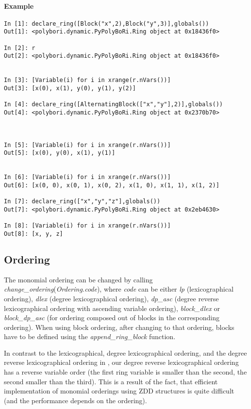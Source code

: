 \documentclass[]{article}
\newcommand{\functionname}[1]{\textit{#1}\xspace}
\begin{document}
\paragraph{Example}
\begin{lstlisting}
In [1]: declare_ring([Block("x",2),Block("y",3)],globals())
Out[1]: <polybori.dynamic.PyPolyBoRi.Ring object at 0x18436f0>

In [2]: r
Out[2]: <polybori.dynamic.PyPolyBoRi.Ring object at 0x18436f0>


In [3]: [Variable(i) for i in xrange(r.nVars())]
Out[3]: [x(0), x(1), y(0), y(1), y(2)]

In [4]: declare_ring([AlternatingBlock(["x","y"],2)],globals())
Out[4]: <polybori.dynamic.PyPolyBoRi.Ring object at 0x2370b70>



In [5]: [Variable(i) for i in xrange(r.nVars())]
Out[5]: [x(0), y(0), x(1), y(1)]


In [6]: [Variable(i) for i in xrange(r.nVars())]
Out[6]: [x(0, 0), x(0, 1), x(0, 2), x(1, 0), x(1, 1), x(1, 2)]

In [7]: declare_ring(["x","y","z"],globals())
Out[7]: <polybori.dynamic.PyPolyBoRi.Ring object at 0x2eb4630>

In [8]: [Variable(i) for i in xrange(r.nVars())]
Out[8]: [x, y, z]  
\end{lstlisting}



\subsection{Ordering}
The monomial ordering can be changed by calling
\functionname{change\_ordering}(\functionname{Ordering.code}), where \functionname{code} can be either \functionname{lp} (lexicographical ordering), \functionname{dlex} (degree lexicographical ordering), \functionname{dp\_asc} (degree reverse lexicographical ordering with ascending variable ordering), \functionname{block\_dlex} or \functionname{block\_dp\_asc} (for ordering composed out of blocks in the corresponding ordering). When using block ordering, after changing to that ordering, blocks have to be defined using the \functionname{append\_ring\_block} function.

In contrast to the lexicographical, degree lexicographical ordering, and the degree reverse lexicographical ordering in \Singular, our degree reverse lexicographical ordering has a reverse variable order (the first ring variable is smaller than the second, the second smaller than the third). This is a result of the fact, that efficient implementation of monomial orderings using ZDD structures is quite difficult (and the performance depends on the ordering).
\end{document}
